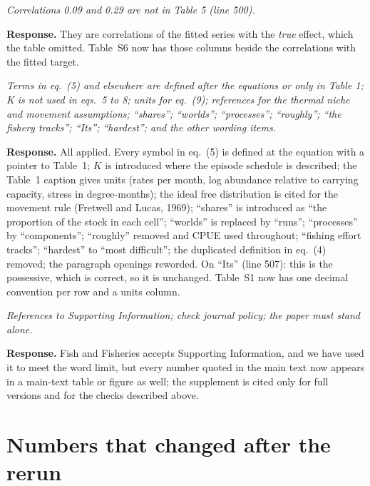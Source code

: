 \documentclass[11pt,a4paper]{article}
\newcommand{\rev}[1]{\par\medskip\noindent\textit{\color{black!60}#1}\par\smallskip}
\newcommand{\resp}{\noindent\textbf{Response.} }
\begin{document}
\rev{Correlations 0.09 and 0.29 are not in Table 5 (line 500).}

\resp They are correlations of the fitted series with the \emph{true} effect, which the table omitted. Table~S6 now has those columns beside the correlations with the fitted target.

\rev{Terms in eq.~(5) and elsewhere are defined after the equations or only in Table 1; K is not used in eqs.~5 to 8; units for eq.~(9); references for the thermal niche and movement assumptions; ``shares''; ``worlds''; ``processes''; ``roughly''; ``the fishery tracks''; ``Its''; ``hardest''; and the other wording items.}

\resp All applied. Every symbol in eq.~(5) is defined at the equation with a pointer to Table~1; $K$ is introduced where the episode schedule is described; the Table~1 caption gives units (rates per month, log abundance relative to carrying capacity, stress in degree-months); the ideal free distribution is cited for the movement rule (Fretwell and Lucas, 1969); ``shares'' is introduced as ``the proportion of the stock in each cell''; ``worlds'' is replaced by ``runs''; ``processes'' by ``components''; ``roughly'' removed and CPUE used throughout; ``fishing effort tracks''; ``hardest'' to ``most difficult''; the duplicated definition in eq.~(4) removed; the paragraph openings reworded. On ``Its'' (line 507): this is the possessive, which is correct, so it is unchanged. Table~S1 now has one decimal convention per row and a units column.

\rev{References to Supporting Information; check journal policy; the paper must stand alone.}

\resp Fish and Fisheries accepts Supporting Information, and we have used it to meet the word limit, but every number quoted in the main text now appears in a main-text table or figure as well; the supplement is cited only for full versions and for the checks described above.

\section*{Numbers that changed after the rerun}
\end{document}
